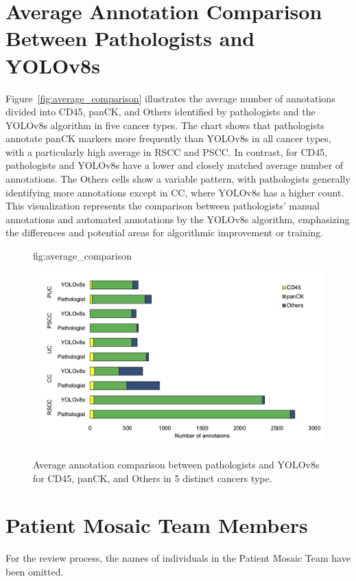 \documentclass{midl} %
\begin{document}
\section{Average Annotation Comparison Between Pathologists and YOLOv8s}
\label{sec:average_comparison}

Figure~\ref{fig:average_comparison} illustrates the average number of annotations divided into CD45, panCK, and Others identified by pathologists and the YOLOv8s algorithm in five cancer types.
The chart shows that pathologists annotate panCK markers more frequently than YOLOv8s in all cancer types, with a particularly high average in RSCC and PSCC. In contrast, for CD45, pathologists and YOLOv8s have a lower and closely matched average number of annotations. The Others cells show a variable pattern, with pathologists generally identifying more annotations except in CC, where YOLOv8s has a higher count. This visualization represents the comparison between pathologists' manual annotations and automated annotations by the YOLOv8s algorithm, emphasizing the differences and potential areas for algorithmic improvement or training.

\begin{figure}[htbp]
\floatconts
  {fig:average_comparison}
  {\caption{Average annotation comparison between pathologists and YOLOv8s for CD45, panCK, and Others in 5 distinct cancers type.}}
  {\includegraphics[width=1\linewidth]{images/4.png}}
\end{figure}


\section{Patient Mosaic Team Members}
\label{sec:appendix_team_members}

For the review process, the names of individuals in the Patient Mosaic Team have been omitted.
\end{document}
